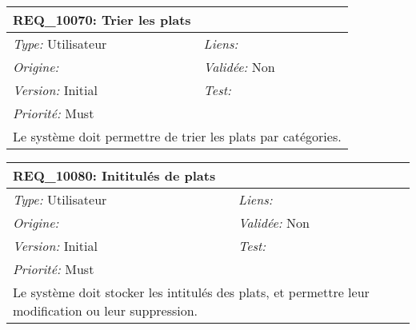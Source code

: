 \begin{table}[!h]

\begin{tabular}{|p{60mm}p{100mm}|}

\hline

\multicolumn{2}{|l|}{\textbf{REQ\_10070:} Trier les plats} \\ \hline

\emph{Type:} Utilisateur & \emph{Liens:}  \\

\emph{Origine:}  & \emph{Validée:} Non \\

\emph{Version:} Initial & \emph{Test:}  \\

\emph{Priorité:} Must & \\ \hline

\multicolumn{2}{|p{16cm}|}{Le système doit permettre de trier les plats par catégories.} \\ \hline

\end{tabular}

\end{table}



\begin{table}[!h]

\begin{tabular}{|p{60mm}p{100mm}|}

\hline

\multicolumn{2}{|l|}{\textbf{REQ\_10080:} Inititulés de plats} \\ \hline

\emph{Type:} Utilisateur & \emph{Liens:}  \\

\emph{Origine:}  & \emph{Validée:} Non \\

\emph{Version:} Initial & \emph{Test:}  \\

\emph{Priorité:} Must & \\ \hline

\multicolumn{2}{|p{16cm}|}{Le système doit stocker les intitulés des plats, et permettre leur modification ou leur suppression.} \\ \hline

\end{tabular}

\end{table}



